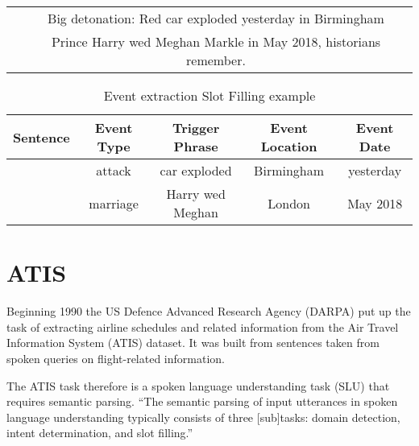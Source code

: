 \documentclass[11pt,a4paper,twoside,openright]{scrbook}
\begin{document}
\medskip
\begin{table}[h]
  \begin{center}
    \begin{tabular}{| c | c |}
      \hline
      [1] & Big detonation: Red car exploded yesterday in Birmingham \\\relax
      [2] & Prince Harry wed Meghan Markle in May 2018, historians remember. \\ \hline
    \end{tabular}
  \end{center}
\end{table}
\vspace{-1cm}
\begin{table}[h]
  \begin{center}
    \begin{tabular}{| c | c | c | c | c |}
      \hline
      Sentence & Event Type & Trigger Phrase & Event Location & Event Date \\ \hline
      [1] & attack & car exploded & Birmingham & yesterday \\\relax
      [2] & marriage & Harry wed Meghan & London & May 2018 \\\hline

    \end{tabular}
  \end{center}
  \caption{Event extraction Slot Filling example}
  \label{table:eventextraction}
\end{table}

\section{ATIS}
Beginning 1990 the US Defence Advanced Research Agency (DARPA) put up the task of extracting airline schedules and related information from the Air Travel Information System (ATIS) dataset. It was built from sentences taken from spoken queries on flight-related information.\cite[p.\,19]{Tur10}

The ATIS task therefore is a spoken language understanding task (SLU) that requires semantic parsing.
``The semantic parsing of input utterances in spoken language understanding typically consists of three [sub]tasks: domain detection, intent determination, and slot filling.''\cite[p.\,1]{Mesnil15}
\end{document}
